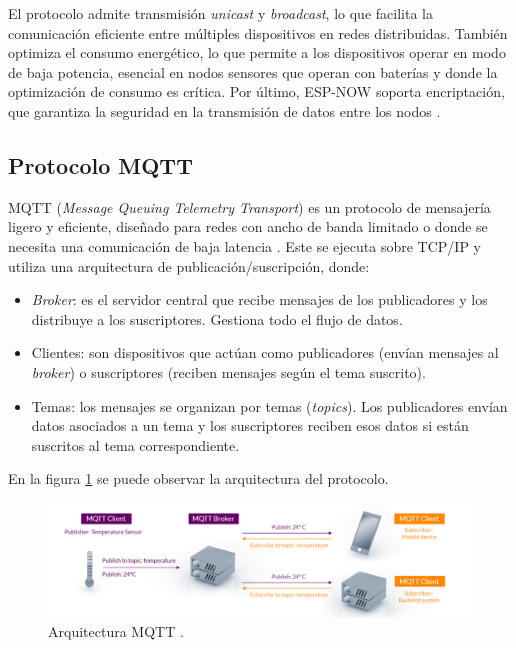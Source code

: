 El protocolo admite transmisión \textit{unicast} y \textit{broadcast}, lo que facilita la comunicación eficiente entre múltiples dispositivos en redes distribuidas. También optimiza el consumo energético, lo que permite a los dispositivos operar en modo de baja potencia, esencial en nodos sensores que operan con baterías y donde la optimización de consumo es crítica.
Por último, ESP-NOW soporta encriptación, que garantiza la seguridad en la transmisión de datos entre los nodos \citep{espnowinfo}.

\subsection{Protocolo MQTT}

MQTT (\textit{Message Queuing Telemetry Transport}) es un protocolo de mensajería ligero y eficiente, diseñado para redes con ancho de banda limitado o donde se necesita una comunicación de baja latencia \citep{mqtt} \citep{mqttinfo}. 
Este se ejecuta sobre TCP/IP y utiliza una arquitectura de publicación/suscripción, donde:

\begin{itemize}
	\item \textit{Broker}: es el servidor central que recibe mensajes de los publicadores y los distribuye a los suscriptores. Gestiona todo el flujo de datos.
	\item Clientes: son dispositivos que actúan como publicadores (envían mensajes al \textit{broker}) o suscriptores (reciben mensajes según el tema suscrito).
	\item Temas: los mensajes se organizan por temas (\textit{topics}). Los publicadores envían datos asociados a un tema y los suscriptores reciben esos datos si están suscritos al tema correspondiente.
\end{itemize}

En la figura \ref{fig:arqmqtt} se puede observar la arquitectura del protocolo.

\begin{figure}[H]
    \centering
    \includegraphics[width=1.1\textwidth]{./Figures/arq_mqtt.png}
    \caption{Arquitectura MQTT \citep{mqtt}.}
    \label{fig:arqmqtt}
\end{figure}

